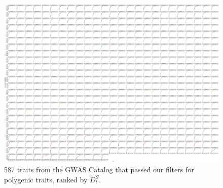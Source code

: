 \documentclass[
]{book}
\begin{document}
\begin{figure}
\includegraphics[width=1\linewidth]{figs/fst/0.1_1000_20220314_ecdf_all_faceted_with_controls_d_rank_long} \caption{587 traits from the GWAS Catalog that passed our filters for polygenic traits, ranked by \({D_t^S}\).}\label{fig:eCDFall}
\end{figure}
\end{document}
